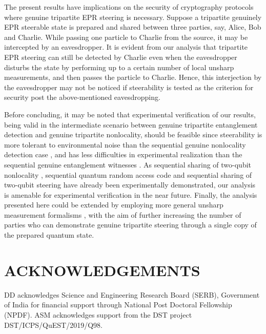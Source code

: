 \documentclass[pra,a4paper,aps,twocolumn,showpacs,superscriptaddress,groupedaddress]{revtex4}
\begin{document}
The present results have implications on the security of cryptography protocols where genuine tripartite EPR steering is necessary. Suppose a tripartite genuinely  EPR steerable state is prepared and shared between three parties, say, Alice, Bob and Charlie. While passing one particle to Charlie from the source, it may be intercepted by an eavesdropper. It is evident from our analysis that tripartite EPR steering can still be detected by Charlie even when the eavesdropper disturbs the state by performing up to a certain number of local unsharp measurements, and then passes the particle to Charlie. Hence, this interjection by the eavesdropper may not be noticed if steerability is tested as the criterion for security post the above-mentioned eavesdropping.


Before concluding, it may be noted that experimental verification of our results, being valid in the intermediate scenario between  genuine tripartite entanglement detection and genuine tripartite nonlocality, should be feasible since steerability is more tolerant to environmental noise than the sequential genuine nonlocality detection case \cite{Saha}, and has less difficulties in experimental realization than the sequential genuine entanglement witnesses \cite{Maity2}. As sequential sharing of two-qubit nonlocality \cite{exp1,exp2,expnew}, sequential quantum random access code \cite{exp4,rac1} and sequential sharing of two-qubit  steering \cite{Choi2020} have already been experimentally demonstrated, our analysis is amenable for experimental verification  in the near future. Finally, the analysis presented here could be extended by employing more general unsharp measurement formalisms \cite{colbeck},  with the aim of further increasing the number of parties who can demonstrate genuine tripartite steering through a single copy of the
prepared quantum state.



\section{ ACKNOWLEDGEMENTS}
DD acknowledges Science and Engineering Research Board (SERB), Government of India for financial support through National Post Doctoral Fellowship (NPDF). ASM acknowledges support from the DST project DST/ICPS/QuEST/2019/Q98.
\end{document}
